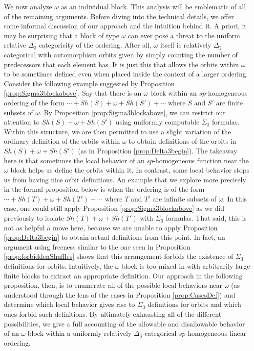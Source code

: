 \documentclass[11pt]{amsart}
\theoremstyle{definition}
\begin{document}
We now analyze $\omega$ as an individual block.
This analysis will be emblematic of all of the remaining arguments.
Before diving into the technical details, we offer some informal discussion of our approach and the intuition behind it.
A priori, it may be surprising that a block of type $\omega$ can ever pose a threat to the uniform relative $\Delta_3$ categoricity of the ordering.
After all, $\omega$ itself is relatively $\Delta_2$ categorical with automorphism orbits given by simply counting the number of predecessors that each element has.
It is just this that allows the orbits within $\omega$ to be sometimes defined even when placed inside the context of a larger ordering.
Consider the following example suggested by Proposition \ref{prop:Sigma3blockabove}.
Say that there is an $\omega$ block within an $sp$-homogeneous ordering of the form $\cdots+Sh(S)+\omega+Sh(S')+\cdots$ where $S$ and $S'$ are finite subsets of $\omega$.
By Proposition \ref{prop:Sigma3blockabove}, we can restrict our attention to $Sh(S)+\omega+Sh(S')$ using uniformly computable $\Sigma_3$ formulas.
Within this structure, we are then permitted to use a slight variation of the ordinary definition of the orbits within $\omega$ to obtain definitions of the orbits in $Sh(S)+\omega+Sh(S')$ (as in Proposition \ref{prop:Delta3begin}).
The takeaway here is that sometimes the local behavior of an \textit{sp}-homogeneous function near the $\omega$ block helps us define the orbits within it.
In contrast, some local behavior stops us from having nice orbit definitions.
An example that we explore more precisely in the formal proposition below is when the ordering is of the form $\cdots+Sh(T)+\omega+Sh(T')+\cdots$ where $T$ and $T'$ are infinite subsets of $\omega$.
In this case, one could still apply Proposition \ref{prop:Sigma3blockabove} as we did previously to isolate $Sh(T)+\omega+Sh(T')$ with $\Sigma_3$ formulas.
That said, this is not as helpful a move here, because we are unable to apply Proposition \ref{prop:Delta3begin} to obtain actual definitions from this point.
In fact, an argument using freeness similar to the one seen in Proposition \ref{prop:forbiddenShuffles} shows that this arrangement forbids the existence of $\Sigma_3$ definitions for orbits.
Intuitively, the $\omega$ block is too mixed in with arbitrarily large finite blocks to extract an appropriate definition. 
Our approach in the following proposition, then, is to enumerate all of the possible local behaviors near $\omega$ (as understood through the lens of the cases in Proposition \ref{prop:CasesDef}) and determine which local behavior gives rise to $\Sigma_3$ definitions for orbits and which ones forbid such definitions.
By ultimately exhausting all of the different possibilities, we give a full accounting of the allowable and disallowable behavior of an $\omega$ block within a uniformly relatively $\Delta_3$ categorical $sp$-homogeneous linear ordering.
\end{document}

